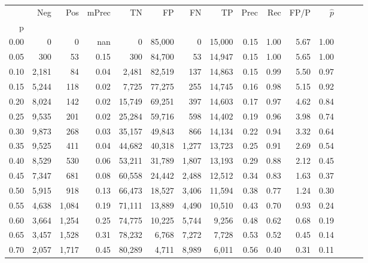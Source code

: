 \begin{tabular}{rrrrrrrrrrrrrrr}
\toprule
{} &    Neg &    Pos & mPrec &      TN &      FP &      FN &      TP &  Prec &   Rec &  FP/P & $\hat{p}$ \\
p    &        &        &       &         &         &         &         &       &       &       &           \\
\midrule
0.00 &      0 &      0 &   nan &       0 &  85,000 &       0 &  15,000 &  0.15 &  1.00 &  5.67 &      1.00 \\
0.05 &    300 &     53 &  0.15 &     300 &  84,700 &      53 &  14,947 &  0.15 &  1.00 &  5.65 &      1.00 \\
0.10 &  2,181 &     84 &  0.04 &   2,481 &  82,519 &     137 &  14,863 &  0.15 &  0.99 &  5.50 &      0.97 \\
0.15 &  5,244 &    118 &  0.02 &   7,725 &  77,275 &     255 &  14,745 &  0.16 &  0.98 &  5.15 &      0.92 \\
0.20 &  8,024 &    142 &  0.02 &  15,749 &  69,251 &     397 &  14,603 &  0.17 &  0.97 &  4.62 &      0.84 \\
0.25 &  9,535 &    201 &  0.02 &  25,284 &  59,716 &     598 &  14,402 &  0.19 &  0.96 &  3.98 &      0.74 \\
0.30 &  9,873 &    268 &  0.03 &  35,157 &  49,843 &     866 &  14,134 &  0.22 &  0.94 &  3.32 &      0.64 \\
0.35 &  9,525 &    411 &  0.04 &  44,682 &  40,318 &   1,277 &  13,723 &  0.25 &  0.91 &  2.69 &      0.54 \\
0.40 &  8,529 &    530 &  0.06 &  53,211 &  31,789 &   1,807 &  13,193 &  0.29 &  0.88 &  2.12 &      0.45 \\
0.45 &  7,347 &    681 &  0.08 &  60,558 &  24,442 &   2,488 &  12,512 &  0.34 &  0.83 &  1.63 &      0.37 \\
0.50 &  5,915 &    918 &  0.13 &  66,473 &  18,527 &   3,406 &  11,594 &  0.38 &  0.77 &  1.24 &      0.30 \\
0.55 &  4,638 &  1,084 &  0.19 &  71,111 &  13,889 &   4,490 &  10,510 &  0.43 &  0.70 &  0.93 &      0.24 \\
0.60 &  3,664 &  1,254 &  0.25 &  74,775 &  10,225 &   5,744 &   9,256 &  0.48 &  0.62 &  0.68 &      0.19 \\
0.65 &  3,457 &  1,528 &  0.31 &  78,232 &   6,768 &   7,272 &   7,728 &  0.53 &  0.52 &  0.45 &      0.14 \\
0.70 &  2,057 &  1,717 &  0.45 &  80,289 &   4,711 &   8,989 &   6,011 &  0.56 &  0.40 &  0.31 &      0.11 \\

\end{tabular}
